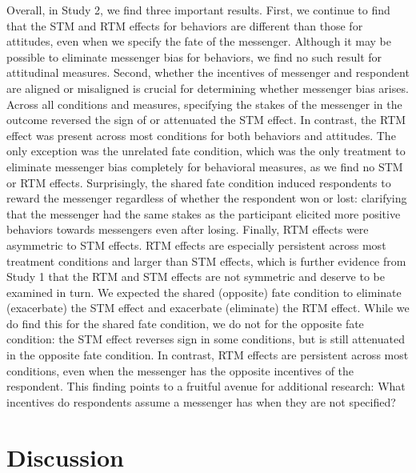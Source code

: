 Overall, in Study 2, we find three important results. First, we continue
to find that the STM and RTM effects for behaviors are different than
those for attitudes, even when we specify the fate of the messenger.
Although it may be possible to eliminate messenger bias for
behaviors, we find no such result for attitudinal measures. Second,
whether the incentives of messenger and respondent are aligned or
misaligned is crucial for determining whether messenger bias arises.
Across all conditions and measures, specifying the stakes of the
messenger in the outcome reversed the sign of or attenuated the STM
effect. In contrast, the RTM effect was present across most conditions
for both behaviors and attitudes. The only exception was the unrelated
fate condition, which was the only treatment to eliminate messenger
bias completely
for behavioral measures, as we find no STM or RTM effects. Surprisingly,
the shared fate condition induced respondents to reward the messenger regardless of whether
the respondent won or lost: clarifying that the messenger had the same
stakes as the participant elicited more positive behaviors towards
messengers even after losing. Finally, RTM effects were asymmetric to
STM effects. RTM effects are especially persistent across most treatment
conditions and larger than STM effects, which is further evidence from
Study 1 that the RTM and STM effects are not symmetric and deserve to
be examined in turn. We expected the shared (opposite) fate condition to
eliminate (exacerbate) the STM effect and exacerbate (eliminate) the RTM
effect. While we do find this for the shared fate condition, we do not for the opposite fate condition: the STM effect reverses sign in some
conditions, but is still attenuated in the opposite fate condition. In contrast, RTM
effects are persistent across most conditions, even when the messenger has the
opposite incentives of the respondent. This finding points to a fruitful avenue for additional research: What incentives do respondents assume a messenger has when they are not specified?

\section{Discussion}

